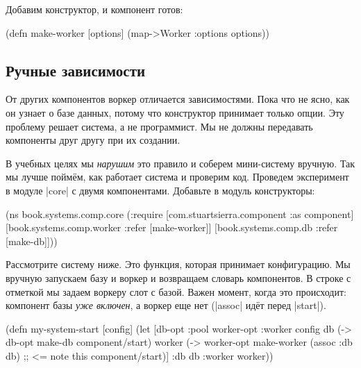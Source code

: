 \noindent
Добавим конструктор, и компонент готов:

\begin{english}
  \begin{clojure}
(defn make-worker
  [options]
  (map->Worker {:options options}))
  \end{clojure}
\end{english}

\subsection{Ручные зависимости}

От других компонентов воркер отличается зависимостями. Пока что не ясно, как
он узнает о базе данных, потому что конструктор принимает только опции. Эту
проблему решает система, а не программист. Мы не должны передавать компоненты
друг другу при их создании.

В учебных целях мы \emph{нарушим} это правило и соберем мини-систему
вручную. Так мы лучше пойм\"{е}м, как работает система и проверим код. Проведем
эксперимент в модуле \spverb|core| с двумя компонентами. Добавьте в модуль
конструкторы:

\begin{english}
  \begin{clojure}
(ns book.systems.comp.core
  (:require
   [com.stuartsierra.component :as component]
   [book.systems.comp.worker :refer [make-worker]]
   [book.systems.comp.db :refer [make-db]]))
  \end{clojure}
\end{english}

Рассмотрите систему ниже. Это функция, которая принимает конфигурацию. Мы
вручную запускаем базу и воркер и возвращаем словарь компонентов. В строке с
отметкой мы задаем воркеру слот с базой. Важен момент, когда это происходит:
компонент базы \emph{уже включен}, а воркер еще нет (\spverb|assoc| ид\"{е}т
перед \spverb|start|).

\begin{english}
  \begin{clojure}
(defn my-system-start
  [config]
  (let [{db-opt :pool
         worker-opt :worker} config
        db (-> db-opt
               make-db
               component/start)
        worker (-> worker-opt
                   make-worker
                   (assoc :db db) ;; <= note this
                   component/start)]
    {:db db :worker worker}))
  \end{clojure}
\end{english}

